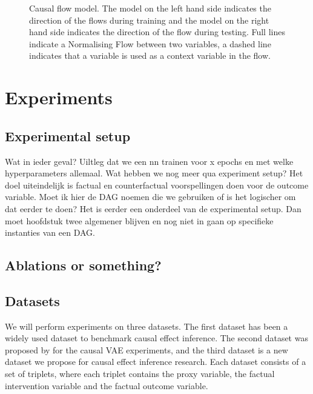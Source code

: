 \documentclass{report}
\begin{document}
\begin{figure}
    \centering
    
    \qquad
    
    \caption{Causal flow model. The model on the left hand side indicates the direction of the flows during training and the model on the right hand side indicates the direction of the flow during testing. Full lines indicate a Normalising Flow between two variables, a dashed line indicates that a variable is used as a context variable in the flow.}
    \label{fig:causal_flow_with_y_prior}
\end{figure}



\chapter{Experiments}

\section{Experimental setup}
Wat in ieder geval? Uiltleg dat we een nn trainen voor x epochs en met welke hyperparameters allemaal. Wat hebben we nog meer qua experiment setup? Het doel uiteindelijk is factual en counterfactual voorspellingen doen voor de outcome variable. Moet ik hier de DAG noemen die we gebruiken of is het logischer om dat eerder te doen? Het is eerder een onderdeel van de experimental setup. Dan moet hoofdstuk twee algemener blijven en nog niet in gaan op specifieke instanties van een DAG.

\section{Ablations or something?}

\section{Datasets}
We will perform experiments on three datasets. The first dataset has been a widely used dataset to benchmark causal effect inference. The second dataset was proposed by \cite{louizos2017causal} for the causal VAE experiments, and the third dataset is a new dataset we propose for causal effect inference research. Each dataset consists of a set of triplets, where each triplet contains the proxy variable, the factual intervention variable and the factual outcome variable.
\end{document}
